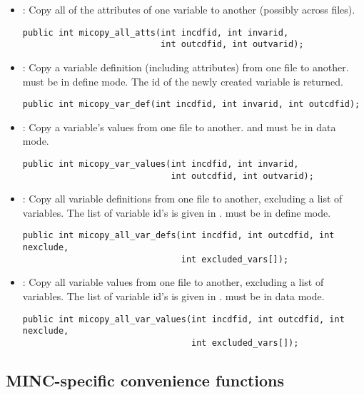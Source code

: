 \begin{itemize}
\item {} : Copy all of the attributes of one
variable to another (possibly across files).
\begin{verbatim}
public int micopy_all_atts(int incdfid, int invarid, 
                           int outcdfid, int outvarid);
\end{verbatim}

\item {} : Copy a variable definition (including
attributes) from one file to another.  must be in
define mode. The id of the newly created variable is returned.
\begin{verbatim}
public int micopy_var_def(int incdfid, int invarid, int outcdfid);
\end{verbatim}

\item {} : Copy a variable's values from one
file to another.  and  must be in data
mode.
\begin{verbatim}
public int micopy_var_values(int incdfid, int invarid, 
                             int outcdfid, int outvarid);
\end{verbatim}

\item {} : Copy all variable definitions from
one file to another, excluding a list of variables. The list of
 variable id's is given in .
 must be in define mode.
\begin{verbatim}
public int micopy_all_var_defs(int incdfid, int outcdfid, int nexclude,
                               int excluded_vars[]);
\end{verbatim}

\item {} : Copy all variable values from one
file to another, excluding a list of variables.  The list of
 variable id's is given in .
 must be in data mode.
\begin{verbatim}
public int micopy_all_var_values(int incdfid, int outcdfid, int nexclude,
                                 int excluded_vars[]);
\end{verbatim}

\end{itemize}

\subsection{MINC-specific convenience functions}

